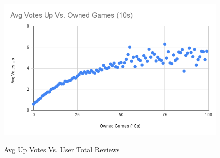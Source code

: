 \begin{figure}[H]
    \centering{}
    \caption{Avg Up Votes Vs. User Total Reviews}

    \includegraphics[width=1\linewidth]{visuals/Avg Votes Up Vs. Owned Games (10s)}
    \label{fig:Average Up Votes Vs. Num Games Owned (10s)}
\end{figure}

